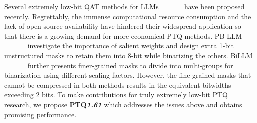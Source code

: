 Several extremely low-bit QAT methods for LLMs ____ have been proposed recently. Regrettably, the immense computational resource consumption and the lack of open-source availability have hindered their widespread application so that there is a growing demand for more economical PTQ methods. PB-LLM ____ investigate the importance of salient weights and design extra 1-bit unstructured masks to retain them into 8-bit while binarizing the others. BiLLM ____ further presents finer-grained masks to divide into multi-groups for binarization using different scaling factors. However, the fine-grained masks that cannot be compressed in both methods results in the equivalent bitwidths exceeding 2 bits. To make contributions for truly extremely low-bit PTQ research, we propose \textbf{PTQ\textit{1.61}} which addresses the issues above and obtains promising performance.